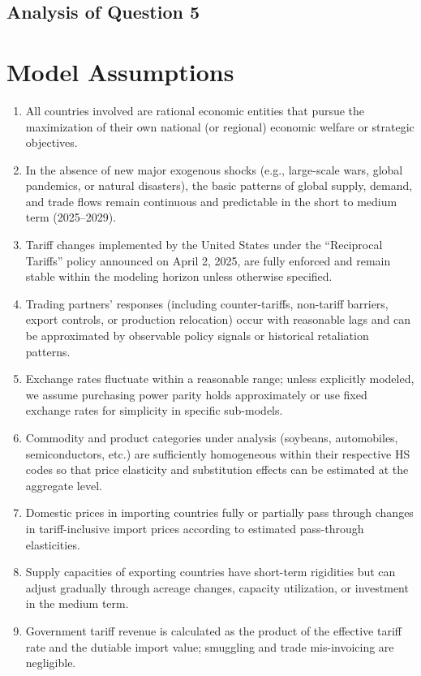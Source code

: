 \documentclass{apmcmthesis}
\begin{document}
\subsection{Analysis of Question 5}

\section{Model Assumptions}
\begin{enumerate}
    \item All countries involved are rational economic entities that pursue the maximization of their own national (or regional) economic welfare or strategic objectives.
    \item In the absence of new major exogenous shocks (e.g., large-scale wars, global pandemics, or natural disasters), the basic patterns of global supply, demand, and trade flows remain continuous and predictable in the short to medium term (2025--2029).
    \item Tariff changes implemented by the United States under the ``Reciprocal Tariffs'' policy announced on April 2, 2025, are fully enforced and remain stable within the modeling horizon unless otherwise specified.
    \item Trading partners' responses (including counter-tariffs, non-tariff barriers, export controls, or production relocation) occur with reasonable lags and can be approximated by observable policy signals or historical retaliation patterns.
    \item Exchange rates fluctuate within a reasonable range; unless explicitly modeled, we assume purchasing power parity holds approximately or use fixed exchange rates for simplicity in specific sub-models.
    \item Commodity and product categories under analysis (soybeans, automobiles, semiconductors, etc.) are sufficiently homogeneous within their respective HS codes so that price elasticity and substitution effects can be estimated at the aggregate level.
    \item Domestic prices in importing countries fully or partially pass through changes in tariff-inclusive import prices according to estimated pass-through elasticities.
    \item Supply capacities of exporting countries have short-term rigidities but can adjust gradually through acreage changes, capacity utilization, or investment in the medium term.
    \item Government tariff revenue is calculated as the product of the effective tariff rate and the dutiable import value; smuggling and trade mis-invoicing are negligible.

\end{enumerate}
\end{document}
